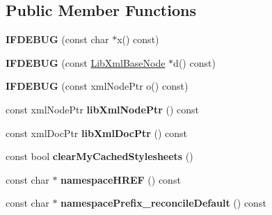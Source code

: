 \subsection*{\-Public \-Member \-Functions}
\begin{DoxyCompactItemize}
\item 
\hypertarget{classgeneral__server_1_1LibXmlBaseNode_a44385a30a1e17016775a39680ff798c2}{{\bfseries \-I\-F\-D\-E\-B\-U\-G} (const char $\ast$x() const)}\label{classgeneral__server_1_1LibXmlBaseNode_a44385a30a1e17016775a39680ff798c2}

\item 
\hypertarget{classgeneral__server_1_1LibXmlBaseNode_a41fec1cd123eecaa37cb8cf11be0a5a3}{{\bfseries \-I\-F\-D\-E\-B\-U\-G} (const \hyperlink{classgeneral__server_1_1LibXmlBaseNode}{\-Lib\-Xml\-Base\-Node} $\ast$d() const)}\label{classgeneral__server_1_1LibXmlBaseNode_a41fec1cd123eecaa37cb8cf11be0a5a3}

\item 
\hypertarget{classgeneral__server_1_1LibXmlBaseNode_ab5b6d42c310fcf4c1a588fcb2fd8ae3f}{{\bfseries \-I\-F\-D\-E\-B\-U\-G} (const xml\-Node\-Ptr o() const)}\label{classgeneral__server_1_1LibXmlBaseNode_ab5b6d42c310fcf4c1a588fcb2fd8ae3f}

\item 
\hypertarget{classgeneral__server_1_1LibXmlBaseNode_aa4c6ee218c7005de376f22141e1f981d}{const xml\-Node\-Ptr {\bfseries lib\-Xml\-Node\-Ptr} () const }\label{classgeneral__server_1_1LibXmlBaseNode_aa4c6ee218c7005de376f22141e1f981d}

\item 
\hypertarget{classgeneral__server_1_1LibXmlBaseNode_addc87f43dd2bc5ec078f9471dda00a0e}{const xml\-Doc\-Ptr {\bfseries lib\-Xml\-Doc\-Ptr} () const }\label{classgeneral__server_1_1LibXmlBaseNode_addc87f43dd2bc5ec078f9471dda00a0e}

\item 
\hypertarget{classgeneral__server_1_1LibXmlBaseNode_a7adf287079e0806b82337513ec33c5b1}{const bool {\bfseries clear\-My\-Cached\-Stylesheets} ()}\label{classgeneral__server_1_1LibXmlBaseNode_a7adf287079e0806b82337513ec33c5b1}

\item 
\hypertarget{classgeneral__server_1_1LibXmlBaseNode_a223679e8d04c935e9ffa5d85b7dbfa80}{const char $\ast$ {\bfseries namespace\-H\-R\-E\-F} () const }\label{classgeneral__server_1_1LibXmlBaseNode_a223679e8d04c935e9ffa5d85b7dbfa80}

\item 
\hypertarget{classgeneral__server_1_1LibXmlBaseNode_a14a2c5bbc2a2359cd5dfd24e11763250}{const char $\ast$ {\bfseries namespace\-Prefix\-\_\-reconcile\-Default} () const }\label{classgeneral__server_1_1LibXmlBaseNode_a14a2c5bbc2a2359cd5dfd24e11763250}


\end{DoxyCompactItemize}
